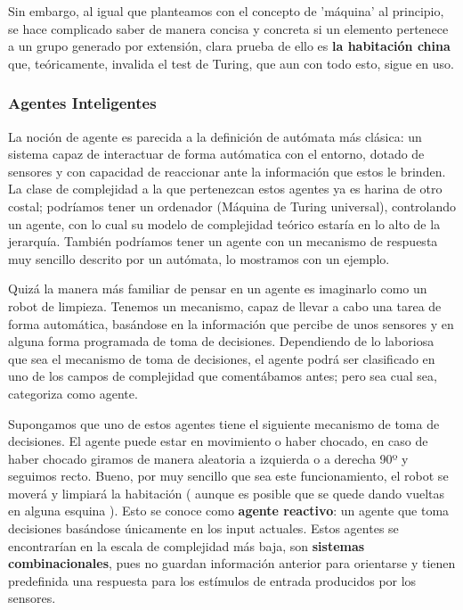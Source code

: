 \vspace{10px}

Sin embargo, al igual que planteamos con el concepto de 'máquina' al principio, se hace complicado saber de manera concisa y concreta si un elemento pertenece a un grupo generado por extensión, clara prueba de ello es \textbf{la habitación china} que, teóricamente, invalida el test de Turing, que aun con todo esto, sigue en uso.

\subsubsection{Agentes Inteligentes}


La noción de agente es parecida a la definición de autómata más clásica: un sistema capaz de interactuar de forma autómatica con el entorno, dotado de sensores y con capacidad de reaccionar ante la información que estos le brinden. La clase de complejidad a la que pertenezcan estos agentes ya es harina de otro costal; podríamos tener un ordenador (Máquina de Turing universal), controlando un agente, con lo cual su modelo de complejidad teórico estaría en lo alto de la jerarquía. También podríamos tener un agente con un mecanismo de respuesta muy sencillo descrito por un autómata, lo mostramos con un ejemplo.


\vspace{10px}

Quizá la manera más familiar de pensar en un agente es imaginarlo como un robot de limpieza. Tenemos un mecanismo, capaz de llevar a cabo una tarea de forma automática, basándose en la información que percibe de unos sensores y en alguna forma programada de toma de decisiones. Dependiendo de lo laboriosa que sea el mecanismo de toma de decisiones, el agente podrá ser clasificado en uno de los campos de complejidad que comentábamos antes; pero sea cual sea, categoriza como agente.

\vspace{10px}

Supongamos que uno de estos agentes tiene el siguiente mecanismo de toma de decisiones. El agente puede estar en movimiento o haber chocado, en caso de haber chocado giramos de manera aleatoria a izquierda o a derecha 90º y seguimos recto. Bueno, por muy sencillo que sea este funcionamiento, el robot se moverá y limpiará la habitación ( aunque es posible que se quede dando vueltas en alguna esquina ). Esto se conoce como \textbf{agente reactivo}: un agente que toma decisiones basándose únicamente en los input actuales. Estos agentes se encontrarían en la escala de complejidad más baja, son \textbf{sistemas combinacionales}, pues no guardan información anterior para orientarse y tienen predefinida una respuesta para los estímulos de entrada producidos por los sensores.


